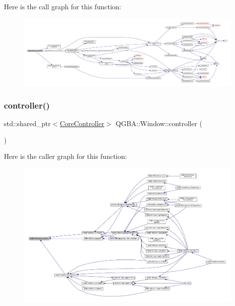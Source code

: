 Here is the call graph for this function\+:
\nopagebreak
\begin{figure}[H]
\begin{center}
\leavevmode
\includegraphics[width=350pt]{class_q_g_b_a_1_1_window_a8ee7661af04e726c88f9628fe5de8236_cgraph}
\end{center}
\end{figure}
\mbox{\label{class_q_g_b_a_1_1_window_a708613d047d676e79ce9b0dbed95a891}} 
\subsubsection{\texorpdfstring{controller()}{controller()}}
{\footnotesize\ttfamily std\+::shared\+\_\+ptr$<$\mbox{\hyperlink{class_q_g_b_a_1_1_core_controller}{Core\+Controller}}$>$ Q\+G\+B\+A\+::\+Window\+::controller (\begin{DoxyParamCaption}{ }\end{DoxyParamCaption})\hspace{0.3cm}{\ttfamily [inline]}}

Here is the caller graph for this function\+:
\nopagebreak
\begin{figure}[H]
\begin{center}
\leavevmode
\includegraphics[width=350pt]{class_q_g_b_a_1_1_window_a708613d047d676e79ce9b0dbed95a891_icgraph}
\end{center}
\end{figure}
\mbox{\label{class_q_g_b_a_1_1_window_ab21ffaf9ea23fa88ba49d691c65af206}} 
